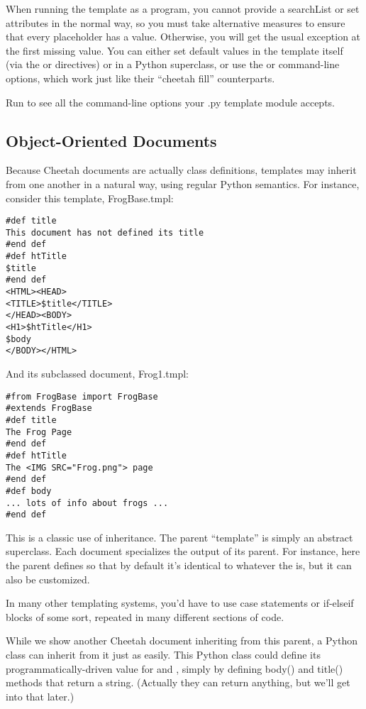 When running the template as a program, you cannot provide a searchList or
set  attributes in the normal way, so you must take
alternative measures to ensure that every placeholder has a value.
Otherwise, you will get the usual  exception at
the first missing value.  You can either set default values in the template
itself (via the  or  directives) or in a Python
superclass, or use the  or  command-line options,
which work just like their ``cheetah fill'' counterparts.

Run  to see all the command-line
options your .py template module accepts.


\subsection{Object-Oriented Documents}
\label{howWorks.objoriented}

Because Cheetah documents are actually class definitions, templates may inherit
from one another in a natural way, using regular Python semantics. For
instance, consider this template, FrogBase.tmpl:

\begin{verbatim}
#def title
This document has not defined its title
#end def
#def htTitle
$title
#end def
<HTML><HEAD>
<TITLE>$title</TITLE>
</HEAD><BODY>
<H1>$htTitle</H1>
$body
</BODY></HTML>
\end{verbatim}

And its subclassed document, Frog1.tmpl:
\begin{verbatim}
#from FrogBase import FrogBase
#extends FrogBase
#def title
The Frog Page
#end def
#def htTitle
The <IMG SRC="Frog.png"> page
#end def
#def body
... lots of info about frogs ...
#end def
\end{verbatim}

This is a classic use of inheritance. The parent ``template'' is simply an
abstract superclass.  Each document specializes the output of its parent.
 For instance, here the parent defines
 so that by default it's identical to whatever the 
 is, but it can also be customized.  

In many other templating systems, you'd have to use case statements or
if-elseif blocks of some sort, repeated in many different sections of code.

While we show another Cheetah document inheriting from this parent, a Python
class can inherit from it just as easily. This Python class could define its
programmatically-driven value for  and , simply by
defining body() and title() methods that return a string.  (Actually they
can return anything, but we'll get into that later.)  

